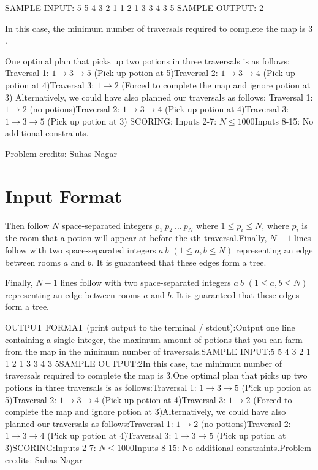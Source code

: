 \documentclass[12pt]{article}
\begin{document}
SAMPLE INPUT:
5
5 4 3 2 1
1 2
1 3
3 4
3 5
SAMPLE OUTPUT: 
2

In this case, the minimum number of traversals required to complete the map is
$3$.

One optimal plan that picks up two potions in three traversals is as follows:
Traversal 1: $1 \rightarrow 3 \rightarrow 5$ (Pick up potion at 5)Traversal 2: $1 \rightarrow 3 \rightarrow 4$ (Pick up potion at 4)Traversal 3: $1 \rightarrow 2$ (Forced to complete the map and ignore potion
at 3)
Alternatively, we could have also planned our traversals as follows:
Traversal 1: $1 \rightarrow 2$ (no potions)Traversal 2: $1 \rightarrow 3 \rightarrow 4$ (Pick up potion at 4)Traversal 3: $1 \rightarrow 3 \rightarrow 5$ (Pick up potion at 3)
SCORING:
Inputs 2-7: $N\le 1000$Inputs 8-15: No additional constraints.


Problem credits: Suhas Nagar



\section*{Input Format}
Then follow $N$ space-separated integers $p_1 \: p_2 \: \ldots \: p_N$ where 
$1 \leq p_i \leq N$, where $p_i$ is the room that a potion will appear at before
the $i$th traversal.Finally, $N-1$ lines follow with two space-separated integers $a \: b$
$(1 \leq a, b \leq N)$  representing an edge between rooms $a$ and $b$. It is
guaranteed that these edges form a tree.

Finally, $N-1$ lines follow with two space-separated integers $a \: b$
$(1 \leq a, b \leq N)$  representing an edge between rooms $a$ and $b$. It is
guaranteed that these edges form a tree.

OUTPUT FORMAT (print output to the terminal / stdout):Output one line containing a single integer, the maximum amount of potions  that
you can farm from the map in the minimum number of traversals.SAMPLE INPUT:5
5 4 3 2 1
1 2
1 3
3 4
3 5SAMPLE OUTPUT:2In this case, the minimum number of traversals required to complete the map is
$3$.One optimal plan that picks up two potions in three traversals is as follows:Traversal 1: $1 \rightarrow 3 \rightarrow 5$ (Pick up potion at 5)Traversal 2: $1 \rightarrow 3 \rightarrow 4$ (Pick up potion at 4)Traversal 3: $1 \rightarrow 2$ (Forced to complete the map and ignore potion
at 3)Alternatively, we could have also planned our traversals as follows:Traversal 1: $1 \rightarrow 2$ (no potions)Traversal 2: $1 \rightarrow 3 \rightarrow 4$ (Pick up potion at 4)Traversal 3: $1 \rightarrow 3 \rightarrow 5$ (Pick up potion at 3)SCORING:Inputs 2-7: $N\le 1000$Inputs 8-15: No additional constraints.Problem credits: Suhas Nagar
\end{document}
